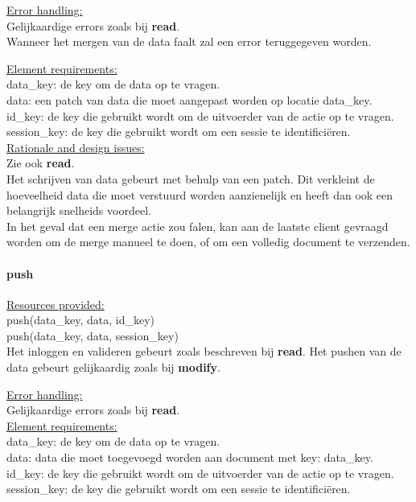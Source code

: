 \documentclass[a4paper,10pt]{article}
\begin{document}
\underline{Error handling:}\\
Gelijkaardige errors zoals bij \textbf{read}.\\
Wanneer het mergen van de data faalt zal een error teruggegeven worden.

\underline{Element requirements:}\\
data\_key: de key om de data op te vragen.\\
data: een patch van data die moet aangepast worden op locatie data\_key.\\ 
id\_key: de key die gebruikt wordt om de uitvoerder van de actie op te vragen.\\
session\_key: de key die gebruikt wordt om een sessie te identifici\"{e}ren.\\

\underline{Rationale and design issues:}\\
Zie ook \textbf{read}.\\
Het schrijven van data gebeurt met behulp van een patch.  Dit verkleint de hoeveelheid data die moet verstuurd worden aanzienelijk en heeft dan ook een belangrijk snelheids voordeel.\\
In het geval dat een merge actie zou falen, kan aan de laatste client gevraagd worden om de merge manueel te doen, of om een volledig document te verzenden.

\paragraph{push}
\underline{Resources provided:}\\
push(data\_key, data, id\_key)\\
push(data\_key, data, session\_key)\\
Het inloggen en valideren gebeurt zoals beschreven bij \textbf{read}.
Het pushen van de data gebeurt gelijkaardig zoals bij \textbf{modify}.

\underline{Error handling:}\\
Gelijkaardige errors zoals bij \textbf{read}.\\

\underline{Element requirements:}\\
data\_key: de key om de data op te vragen.\\
data: data die moet toegevoegd worden aan document met key: data\_key.\\
id\_key: de key die gebruikt wordt om de uitvoerder van de actie op te vragen.\\
session\_key: de key die gebruikt wordt om een sessie te identifici\"{e}ren.\\
\end{document}
